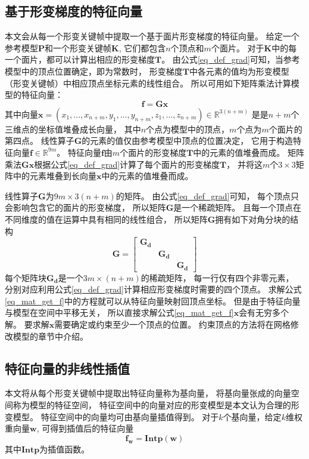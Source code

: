 \subsection{基于形变梯度的特征向量}\label{sec_feature}
本文会从每一个形变关键帧中提取一个基于面片形变梯度的特征向量。
给定一个参考模型$\bm{P}$和一个形变关键帧$\bm{K}$,
它们都包含$n$个顶点和$m$个面片。
对于$\bm{K}$中的每一个面片，都可以计算出相应的形变梯度$\bm{T}$。
由公式\ref{eq_def_grad}可知，当参考模型中的顶点位置确定，即为常数时，
形变梯度$\bm{T}$中各元素的值均为形变模型（形变关键帧）中相应顶点坐标元素的线性组合。
所以可用如下矩阵乘法计算模型的特征向量：
\begin{equation}
    \label{eq_mat_get_f}
    \bm{f}=\bm{G}\bm{x}
\end{equation}
其中向量$\bm{x}=(x_1,...,x_{n+m},y_1,...,y_{n+m},z_1,...,z_{n+m}) \in \mathbb{R}^{3(n+m)}$
是是$n+m$个三维点的坐标值堆叠成长向量，
其中$n$个点为模型中的顶点，$m$个点为$m$个面片的第四点。
线性算子$\bm{G}$的元素的值仅由参考模型中顶点的位置决定，
它用于构造特征向量$\bm{f}\in\mathbb{R}^{9m}$。
特征向量$\bm{f}$由$m$个面片的形变梯度$\bm{T}$中的元素的值堆叠而成。
矩阵乘法$\bm{Gx}$根据公式\ref{eq_def_grad}计算了每个面片的形变梯度$\bm{T}$，
并将这$m$个$3 \times 3$矩阵中的元素堆叠到长向量$\bm{x}$中的元素的值堆叠而成。

线性算子$\bm{G}$为$9m\times 3(n+m)$的矩阵。
由公式\ref{eq_def_grad}可知，
每个顶点只会影响包含它的面片的形变梯度，
所以矩阵$\bm{G}$是一个稀疏矩阵。
且每一个顶点在不同维度的值在运算中具有相同的线性组合，
所以矩阵$\bm{G}$拥有如下对角分块的结构
\begin{equation}
    \bm{G}=
    \begin{bmatrix}
        \bm{G_d} &        & \\ 
         &       \bm{G_d} & \\ 
         &       &        \bm{G_d}
    \end{bmatrix}
\end{equation}
每个矩阵块$\bm{G_d}$是一个$3m \times (n+m)$的稀疏矩阵，
每一行仅有四个非零元素，
分别对应利用公式\ref{eq_def_grad}计算相应形变梯度时需要的四个顶点。
求解公式\ref{eq_mat_get_f}中的方程就可以从特征向量映射回顶点坐标。
但是由于特征向量与模型在空间中平移无关，
所以直接求解公式\ref{eq_mat_get_f}$\bm{x}$会有无穷多个解。
要求解$\bm{x}$需要确定或约束至少一个顶点的位置。
约束顶点的方法将在网格修改模型的章节中介绍。
\subsection{特征向量的非线性插值}
本文将从每个形变关键帧中提取出特征向量称为基向量，
将基向量张成的向量空间称为模型的特征空间，
特征空间中的向量对应的形变模型是本文认为合理的形变模型。
特征空间中的向量均可由基向量插值得到。
对于$k$个基向量，给定$k$维权重向量$\bm{w}$,
可得到插值后的特征向量
\begin{equation}
    \label{eq_intp}
    \bm{f_w}=\bm{Intp}(\bm{w})
\end{equation}
其中$\bm{Intp}$为插值函数。

